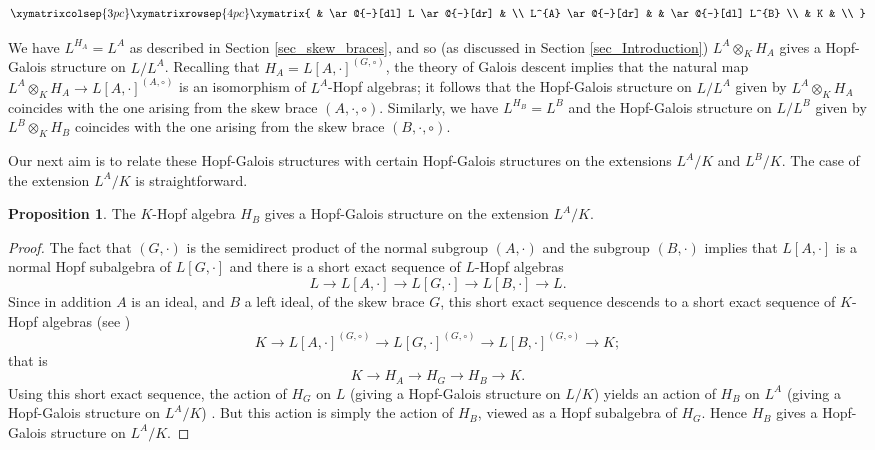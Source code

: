 \documentclass[12pt,a4paper, reqno]{amsart}
\theoremstyle{definition}
\newtheorem{proposition}[theorem]{Proposition}
\begin{document}
\[
\xymatrixcolsep{3pc} 
\xymatrixrowsep{4pc}
\xymatrix{
& \ar@{-}[dl] L \ar@{-}[dr] & \\
 L^{A} \ar@{-}[dr] & & \ar@{-}[dl] L^{B} \\
& K & \\
} 
\]

We have $ L^{H_{A}} = L^{A} $ as described in Section \ref{sec_skew_braces}, and so (as discussed in Section \ref{sec_Introduction}) $ L^{A} \otimes_{K} H_{A} $ gives a Hopf-Galois structure on $ L/L^{A} $. Recalling that $ H_{A}=L[A,\cdot]^{(G,\circ)} $, the theory of Galois descent implies that the natural  map $ L^{A} \otimes_{K} H_{A} \rightarrow L[A,\cdot]^{(A,\circ)} $ is an isomorphism of $ L^{A} $-Hopf algebras; it follows that the Hopf-Galois structure on $ L/L^{A} $ given by $ L^{A} \otimes_{K} H_{A} $ coincides with the one arising from the skew brace $ (A,\cdot,\circ) $. Similarly, we have $ L^{H_{B}}=L^{B} $ and the Hopf-Galois structure on $ L/L^{B} $ given by $ L^{B} \otimes_{K} H_{B} $ coincides with the one arising from the skew brace $ (B,\cdot,\circ) $.

Our next aim is to relate these Hopf-Galois structures with certain Hopf-Galois structures on the extensions $ L^{A}/K $ and $ L^{B}/K $. The case of the extension $ L^{A}/K $ is straightforward. 

\begin{proposition} \label{prop_H_B_HGS}
The $ K $-Hopf algebra $ H_{B} $ gives a Hopf-Galois structure on the extension $ L^{A}/K $. 
\end{proposition}
\begin{proof}
The fact that $ (G,\cdot) $ is the semidirect product of the normal subgroup $ (A,\cdot) $ and the subgroup $ (B,\cdot) $ implies that $ L[A,\cdot] $ is a normal Hopf subalgebra of $ L[G,\cdot] $ and there is a short exact sequence of $ L $-Hopf algebras
\[ L \rightarrow L[A,\cdot] \rightarrow L[G,\cdot] \rightarrow L[B,\cdot] \rightarrow L. \]
Since in addition $ A $ is an ideal, and $ B $ a left ideal, of the skew brace $ G $, this short exact sequence descends to a short exact sequence of $ K $-Hopf algebras (see \cite[Example 2.1]{ST23})
\[ K \rightarrow L[A,\cdot]^{(G,\circ)} \rightarrow L[G,\cdot]^{(G,\circ)} \rightarrow L[B,\cdot]^{(G,\circ)} \rightarrow K; \]
that is
\[ K \rightarrow H_{A} \rightarrow H_{G} \rightarrow H_{B} \rightarrow K. \]
Using this short exact sequence, the action of $ H_{G} $ on $ L $ (giving a Hopf-Galois structure on $ L/K $) yields an action of $ H_{B} $ on $ L^{A} $ (giving a Hopf-Galois structure on $ L^{A}/K $) \cite[Lemma 4.1]{By02}. But this action is simply the action of $ H_{B} $, viewed as a Hopf subalgebra of $ H_{G} $. Hence $ H_{B} $ gives a Hopf-Galois structure on $ L^{A}/K $. 
\end{proof}
\end{document}
